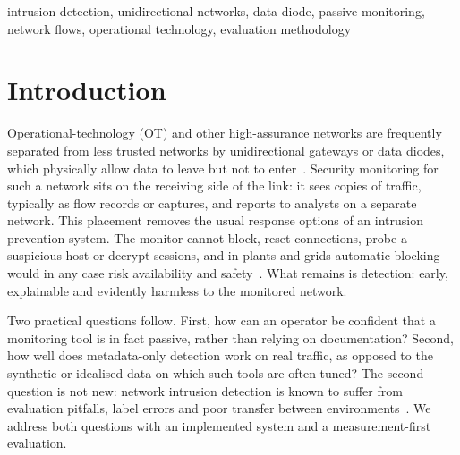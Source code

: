 \documentclass[conference]{IEEEtran}
\begin{document}
\begin{IEEEkeywords}
intrusion detection, unidirectional networks, data diode, passive monitoring, network flows, operational technology, evaluation methodology
\end{IEEEkeywords}

\section{Introduction}
Operational-technology (OT) and other high-assurance networks are frequently separated from less trusted networks by unidirectional gateways or data diodes, which physically allow data to leave but not to enter~\cite{okhravi2010diodes,nist80082r3}. Security monitoring for such a network sits on the receiving side of the link: it sees copies of traffic, typically as flow records or captures, and reports to analysts on a separate network. This placement removes the usual response options of an intrusion prevention system. The monitor cannot block, reset connections, probe a suspicious host or decrypt sessions, and in plants and grids automatic blocking would in any case risk availability and safety~\cite{nist80082r3}. What remains is detection: early, explainable and evidently harmless to the monitored network.

Two practical questions follow. First, how can an operator be confident that a monitoring tool is in fact passive, rather than relying on documentation? Second, how well does metadata-only detection work on real traffic, as opposed to the synthetic or idealised data on which such tools are often tuned? The second question is not new: network intrusion detection is known to suffer from evaluation pitfalls, label errors and poor transfer between environments~\cite{sommer2010outside,arp2022dos,engelen2021troubleshooting}. We address both questions with an implemented system and a measurement-first evaluation.
\end{document}
